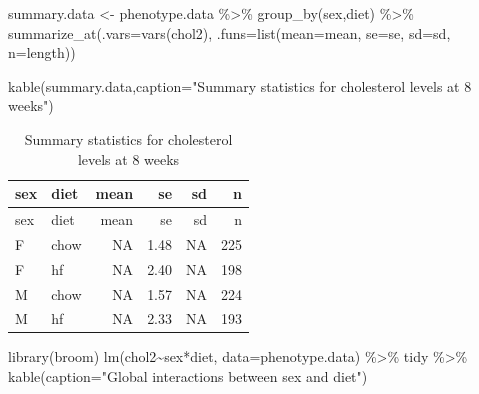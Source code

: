 \documentclass[
]{article}
\newenvironment{Shaded}{\begin{snugshade}}{\end{snugshade}}
\newcommand{\AttributeTok}[1]{\textcolor[rgb]{0.77,0.63,0.00}{#1}}
\newcommand{\FunctionTok}[1]{\textcolor[rgb]{0.00,0.00,0.00}{#1}}
\newcommand{\NormalTok}[1]{#1}
\newcommand{\OtherTok}[1]{\textcolor[rgb]{0.56,0.35,0.01}{#1}}
\newcommand{\SpecialCharTok}[1]{\textcolor[rgb]{0.00,0.00,0.00}{#1}}
\newcommand{\StringTok}[1]{\textcolor[rgb]{0.31,0.60,0.02}{#1}}
\begin{document}
\begin{Shaded}
\begin{Highlighting}[]
\NormalTok{summary.data }\OtherTok{\textless{}{-}}
\NormalTok{  phenotype.data }\SpecialCharTok{\%\textgreater{}\%}
  \FunctionTok{group\_by}\NormalTok{(sex,diet) }\SpecialCharTok{\%\textgreater{}\%}
  \FunctionTok{summarize\_at}\NormalTok{(}\AttributeTok{.vars=}\FunctionTok{vars}\NormalTok{(chol2), }\AttributeTok{.funs=}\FunctionTok{list}\NormalTok{(}\AttributeTok{mean=}\NormalTok{mean,}
                                             \AttributeTok{se=}\NormalTok{se,}
                                             \AttributeTok{sd=}\NormalTok{sd,}
                                             \AttributeTok{n=}\NormalTok{length))}

\FunctionTok{kable}\NormalTok{(summary.data,}\AttributeTok{caption=}\StringTok{"Summary statistics for cholesterol levels at 8 weeks"}\NormalTok{)}
\end{Highlighting}
\end{Shaded}

\begin{longtable}[]{@{}llrrrr@{}}
\caption{Summary statistics for cholesterol levels at 8
weeks}\tabularnewline
\toprule()
sex & diet & mean & se & sd & n \\
\midrule()
\endfirsthead
\toprule()
sex & diet & mean & se & sd & n \\
\midrule()
\endhead
F & chow & NA & 1.48 & NA & 225 \\
F & hf & NA & 2.40 & NA & 198 \\
M & chow & NA & 1.57 & NA & 224 \\
M & hf & NA & 2.33 & NA & 193 \\
\bottomrule()
\end{longtable}

\begin{Shaded}
\begin{Highlighting}[]
\FunctionTok{library}\NormalTok{(broom)}
\FunctionTok{lm}\NormalTok{(chol2}\SpecialCharTok{\textasciitilde{}}\NormalTok{sex}\SpecialCharTok{*}\NormalTok{diet, }\AttributeTok{data=}\NormalTok{phenotype.data) }\SpecialCharTok{\%\textgreater{}\%}
\NormalTok{  tidy }\SpecialCharTok{\%\textgreater{}\%}
  \FunctionTok{kable}\NormalTok{(}\AttributeTok{caption=}\StringTok{"Global interactions between sex and diet"}\NormalTok{)}
\end{Highlighting}
\end{Shaded}
\end{document}
